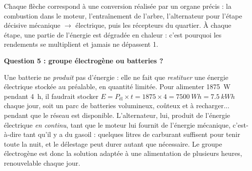 \documentclass[11pt]{article}
\begin{document}
\begin{exoresolu}
\begin{center}
\end{center}

Chaque flèche correspond à une conversion réalisée par un organe précis : la combustion dans le moteur, l'entraînement de l'arbre, l'alternateur pour l'étape décisive mécanique $\rightarrow$ électrique, puis les récepteurs du quartier. À chaque étape, une partie de l'énergie est dégradée en chaleur : c'est pourquoi les rendements se multiplient et jamais ne dépassent 1.

\medskip
\textbf{Question 5 : groupe électrogène ou batteries ?}

Une batterie ne \emph{produit} pas d'énergie : elle ne fait que \emph{restituer} une énergie électrique stockée au préalable, en quantité limitée. Pour alimenter \SI{1875}{W} pendant 4~h, il faudrait stocker $E = P_{\text{él}} \times t = 1875 \times 4 = \SI{7500}{Wh} = \SI{7,5}{kWh}$ chaque jour, soit un parc de batteries volumineux, coûteux et à recharger... pendant que le réseau est disponible. L'alternateur, lui, produit de l'énergie électrique \emph{en continu}, tant que le moteur lui fournit de l'énergie mécanique, c'est-à-dire tant qu'il y a du gasoil : quelques litres de carburant suffisent pour tenir toute la nuit, et le délestage peut durer autant que nécessaire. Le groupe électrogène est donc la solution adaptée à une alimentation de plusieurs heures, renouvelable chaque jour.
\end{exoresolu}
\end{document}
